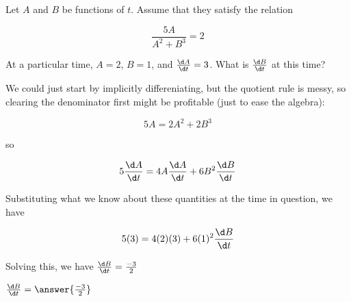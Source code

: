 \documentclass{ximera}
\author{Steven Gubkin}
\begin{document}
\begin{exercise}



Let $A$ and $B$ be functions of $t$.  Assume that they satisfy the relation

\[
\frac{5A}{A^2+B^3} = 2 
\]

At a particular time, $A = 2$, $B =1$, and $\frac{\d A}{\d t} = 3$.  What is $\frac{\d B}{\d t}$ at this time?

\begin{hint}
	We could just start by implicitly differeniating, but the quotient rule is messy, so clearing the denominator first might be profitable (just to ease the algebra):

\[
5A = 2A^2+2B^3
\]

so 

\[
5\frac{\d A}{\d t} = 4A\frac{\d A}{\d t}+6B^2\frac{\d B}{\d t}
\]
\end{hint}

\begin{hint}
	Substituting what we know about these quantities at the time in question, we have

\[
5(3) = 4(2)(3)+6(1)^2\frac{\d B}{\d t}
\]
\end{hint}

\begin{hint}
	Solving this, we have $\frac{\d B}{\d t} = \frac{-3}{2} $
\end{hint}

\begin{prompt}
	$\frac{\d B}{\d t} = \answer{\frac{-3}{2}} $
\end{prompt}

\end{exercise}
\end{document}
